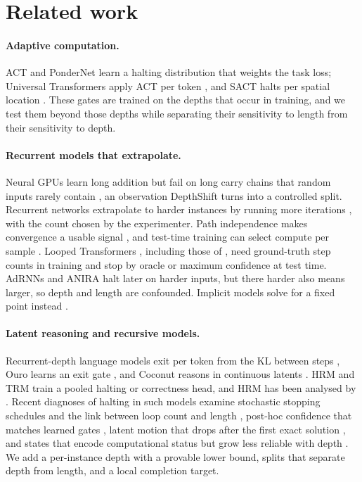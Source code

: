 \section{Related work}
\label{sec:related}

\paragraph{Adaptive computation.} ACT \citep{graves2016act} and PonderNet \citep{banino2021pondernet}
learn a halting distribution that weights the task loss; Universal Transformers apply ACT per token
\citep{dehghani2019universal}, and SACT halts per spatial location \citep{figurnov2017sact}. These gates
are trained on the depths that occur in training, and we test them beyond those depths while separating
their sensitivity to length from their sensitivity to depth.

\paragraph{Recurrent models that extrapolate.} Neural GPUs learn long addition
\citep{kaiser2016neuralgpu} but fail on long carry chains that random inputs rarely contain
\citep{price2016extensions}, an observation DepthShift turns into a controlled split. Recurrent networks
extrapolate to harder instances by running more iterations
\citep{schwarzschild2021thinking,schwarzschild2021datasets,bansal2022endtoend}, with the count chosen by
the experimenter. Path independence makes convergence a usable signal \citep{anil2022path}, and
test-time training can select compute per sample \citep{bao2025stop}. Looped Transformers
\citep{giannou2023looped,yang2024looped,saunshi2025latent}, including those of \citet{fan2025looped}, need
ground-truth step counts in training and stop by oracle or maximum confidence at test time. AdRNNs
\citep{veerabadran2023adaptive} and ANIRA \citep{moosa2026anira} halt later on harder inputs, but there
harder also means larger, so depth and length are confounded. Implicit models solve for a fixed point
instead \citep{bai2019deq}.

\paragraph{Latent reasoning and recursive models.} Recurrent-depth language models exit per token from
the KL between steps \citep{geiping2025scaling}, Ouro learns an exit gate \citep{zhu2025ouro}, and Coconut
reasons in continuous latents \citep{hao2024coconut}. HRM \citep{wang2025hrm} and TRM
\citep{jolicoeur2025trm} train a pooled halting or correctness head, and HRM has been analysed by
\citet{ge2025hrm}. Recent diagnoses of halting in such models examine stochastic stopping schedules and
the link between loop count and length \citep{kuo2026stochastic}, post-hoc confidence that matches learned
gates \citep{popescu2026halting}, latent motion that drops after the first exact solution
\citep{krishna2026finish}, and states that encode computational status but grow less reliable with depth
\citep{liang2026horizon}. We add a per-instance depth with a provable lower bound, splits that separate
depth from length, and a local completion target.

